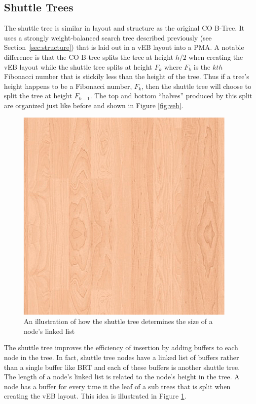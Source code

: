 \documentclass{style}
\begin{document}
\subsection{Shuttle Trees}

The shuttle tree is similar in layout and structure as the original CO B-Tree.
It uses a strongly weight-balanced search tree described previously (see
Section~\ref{sec:structure}) that is laid out in a vEB layout into a PMA. A
notable difference is that the CO B-tree splits the tree at height $h/2$ when
creating the vEB layout while the shuttle tree splits at height $F_k$ where
$F_k$ is the $kth$ Fibonacci number that is stickily less than the height of
the tree. Thus if a tree's height happens to be a Fibonacci number, $F_k$,
then the shuttle tree will choose to split the tree at height $F_{k-1}$. The
top and bottom ``halves'' produced by this split are organized just like
before and shown in Figure \ref{fig:veb}.

\begin{figure}

\begin{center}
	\includegraphics[width=0.8\columnwidth]{figures/veb.png}
\end{center}

\caption{An illustration of how the shuttle tree determines the size of a node's linked list}
\label{fig:buffers}
\end{figure}


The shuttle tree improves the efficiency of insertion by adding buffers to
each node in the tree. In fact, shuttle tree nodes have a linked list of
buffers rather than a single buffer like BRT and each of these buffers is
another shuttle tree. The length of a node's linked list is related to the
node's height in the tree. A node has a buffer for every time it the leaf of a
sub trees that is split when creating the vEB layout. This idea is illustrated
in Figure \ref{fig:buffers}.
\end{document}
